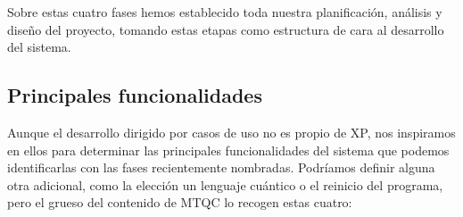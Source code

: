 Sobre estas cuatro fases hemos establecido toda nuestra planificación, análisis y diseño del proyecto, tomando estas etapas como estructura de cara al desarrollo del sistema.

\subsection{Principales funcionalidades}

Aunque el desarrollo dirigido por casos de uso no es propio de XP, nos inspiramos en ellos para determinar las principales funcionalidades del sistema que podemos identificarlas con las fases recientemente nombradas. Podríamos definir alguna otra adicional, como la elección un lenguaje cuántico o el reinicio del programa, pero el grueso del contenido de MTQC lo recogen estas cuatro:

